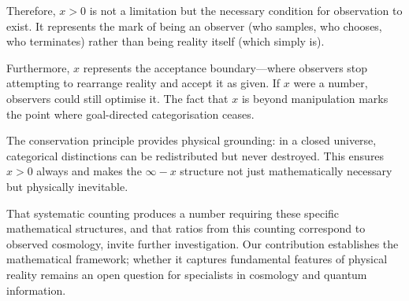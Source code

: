 Therefore, $x > 0$ is not a limitation but the necessary condition for observation to exist. It represents the mark of being an observer (who samples, who chooses, who terminates) rather than being reality itself (which simply is).

Furthermore, $x$ represents the acceptance boundary—where observers stop attempting to rearrange reality and accept it as given. If $x$ were a number, observers could still optimise it. The fact that $x$ is beyond manipulation marks the point where goal-directed categorisation ceases.

The conservation principle provides physical grounding: in a closed universe, categorical distinctions can be redistributed but never destroyed. This ensures $x > 0$ always and makes the $\infty - x$ structure not just mathematically necessary but physically inevitable.

That systematic counting produces a number requiring these specific mathematical structures, and that ratios from this counting correspond to observed cosmology, invite further investigation. Our contribution establishes the mathematical framework; whether it captures fundamental features of physical reality remains an open question for specialists in cosmology and quantum information.


